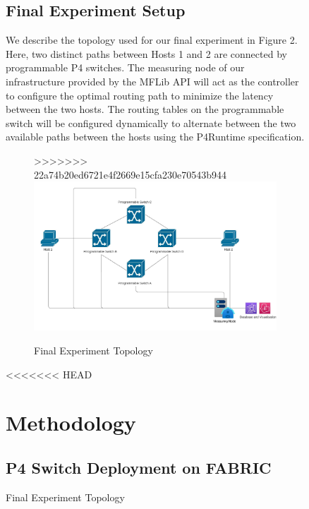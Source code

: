 \documentclass[conference]{IEEEtran}
\begin{document}
\begin{figure}[h!]
    \subsection{Final Experiment Setup}
    We describe the topology used for our final experiment in Figure 2. Here, two distinct paths between Hosts 1 and 2 are connected by programmable P4 switches. The measuring node of our infrastructure provided by the MFLib API will act as the controller to configure the optimal routing path to minimize the latency between the two hosts. The routing tables on the programmable switch will be configured dynamically to alternate between the two available paths between the hosts using the P4Runtime specification.
    \begin{figure}[h]
>>>>>>> 22a74b20ed6721e4f2669e15cfa230e70543b944
        \centering
        \includegraphics[scale=0.4]{Final_Switch_Topology.jpeg}
        \caption{Final Experiment Topology}
    \end{figure}
<<<<<<< HEAD
     
    \section{Methodology}
    \subsection{P4 Switch Deployment on FABRIC}
    	

\end{figure}
\end{document}

